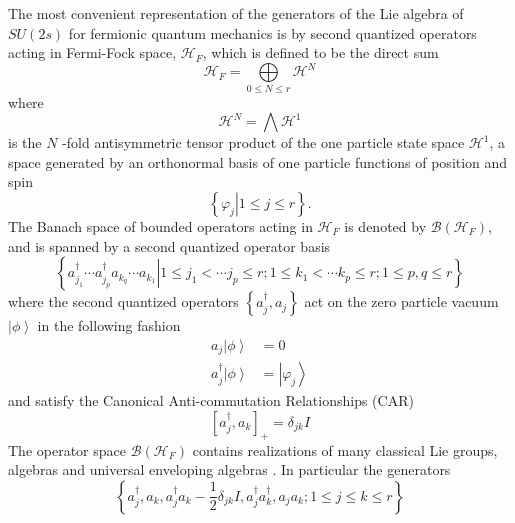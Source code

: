 \documentclass[aps,preprint]{revtex4}%
\begin{document}
The most convenient representation of the generators of the Lie algebra of
$SU(2s)$ for fermionic quantum mechanics is by second quantized operators
acting in Fermi-Fock space, $\mathcal{H}_{F}$, which is defined to be the
direct sum
\begin{equation}
\mathcal{H}_{F}=%
{\textstyle\bigoplus\limits_{0\leq N\leq r}}
\mathcal{H}^{N}%
\end{equation}
where
\begin{equation}
\mathcal{H}^{N}=%
{\textstyle\bigwedge}
\mathcal{H}^{1}%
\end{equation}
is the $N$ -fold antisymmetric tensor product of the one particle state space
$\mathcal{H}^{1}$, a space generated by an orthonormal basis of one particle
functions of position and spin
\begin{equation}
\left\{  \left.  \varphi_{j}\right\vert 1\leq j\leq r\right\}  .
\end{equation}
The Banach space \cite{banach} of bounded operators acting in $\mathcal{H}%
_{F}$ is denoted by $\mathcal{B}\left(  \mathcal{H}_{F}\right)  ,$ and is
spanned by a second quantized operator basis
\begin{equation}
\left\{  \left.  a_{j_{1}}^{\dagger}\cdots a_{j_{p}}^{\dagger}a_{k_{q}}\cdots
a_{k_{1}}\right\vert 1\leq j_{1}<\cdots j_{p}\leq r;1\leq k_{1}<\cdots
k_{p}\leq r;1\leq p,q\leq r\right\}
\end{equation}
where the second quantized operators $\left\{  a_{j}^{\dagger},a_{j}\right\}
$ act on the zero particle vacuum $\left\vert \phi\right\rangle $ in the
following fashion%
\begin{align}
a_{j}\left\vert \phi\right\rangle  &  =0\nonumber\\
a_{j}^{\dagger}\left\vert \phi\right\rangle  &  =\left\vert \varphi
_{j}\right\rangle
\end{align}
and satisfy the Canonical Anti-commutation Relationships (CAR)
\begin{equation}
\left[  a_{j}^{\dagger},a_{k}\right]  _{+}=\delta_{jk}I
\end{equation}
The operator space $\mathcal{B}\left(  \mathcal{H}_{F}\right)  $ contains
realizations of many classical Lie groups, algebras and universal enveloping
algebras \cite{envelop}. In particular the generators
\begin{equation}
\left\{  a_{j}^{\dagger},a_{k},a_{j}^{\dagger}a_{k}-\frac{1}{2}\delta
_{jk}I,a_{j}^{\dagger}a_{k}^{\dagger},a_{j}a_{k};1\leq j\leq k\leq r\right\}
\end{equation}
\end{document}
